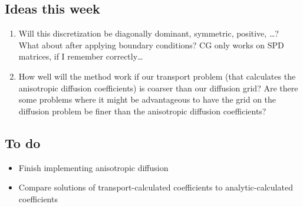 \documentclass[11pt]{SRJresearch}
\begin{document}
\subsection{Ideas this week}
\begin{enumerate}
  \item Will this discretization be diagonally dominant, symmetric, positive,
    \ldots? What about after applying boundary conditions? CG only works on SPD
    matrices, if I remember correctly\ldots

  \item How well will the method work if our transport problem (that calculates
    the anisotropic diffusion coefficients) is coarser than our diffusion grid?
    Are there some problems where it might be advantageous to have the grid on
    the diffusion problem be finer than the anisotropic diffusion coefficients?
\end{enumerate}

\subsection{To do}
\begin{itemize}
  \item Finish implementing anisotropic diffusion
  \item Compare solutions of transport-calculated coefficients to
    analytic-calculated coefficients
\end{itemize}


\end{document}

